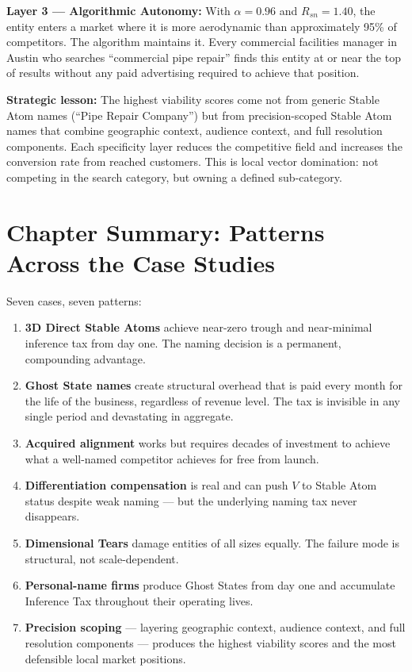 \documentclass[12pt, openany]{book}
\theoremstyle{thmstyle}
\theoremstyle{defstyle}
\begin{document}
\begin{casebox}
\textbf{Layer 3 --- Algorithmic Autonomy:} With $\alpha = 0.96$ and $R_{sn} = 1.40$, the entity enters a market where it is more aerodynamic than approximately 95\% of competitors. The algorithm maintains it. Every commercial facilities manager in Austin who searches ``commercial pipe repair'' finds this entity at or near the top of results without any paid advertising required to achieve that position.

\textbf{Strategic lesson:} The highest viability scores come not from generic Stable Atom names (``Pipe Repair Company'') but from precision-scoped Stable Atom names that combine geographic context, audience context, and full resolution components. Each specificity layer reduces the competitive field and increases the conversion rate from reached customers. This is local vector domination: not competing in the search category, but owning a defined sub-category.
\end{casebox}

\section{Chapter Summary: Patterns Across the Case Studies}

Seven cases, seven patterns:

\begin{enumerate}[leftmargin=1.5em]
  \item \textbf{3D Direct Stable Atoms} achieve near-zero trough and near-minimal inference tax from day one. The naming decision is a permanent, compounding advantage.
  \item \textbf{Ghost State names} create structural overhead that is paid every month for the life of the business, regardless of revenue level. The tax is invisible in any single period and devastating in aggregate.
  \item \textbf{Acquired alignment} works but requires decades of investment to achieve what a well-named competitor achieves for free from launch.
  \item \textbf{Differentiation compensation} is real and can push $V$ to Stable Atom status despite weak naming --- but the underlying naming tax never disappears.
  \item \textbf{Dimensional Tears} damage entities of all sizes equally. The failure mode is structural, not scale-dependent.
  \item \textbf{Personal-name firms} produce Ghost States from day one and accumulate Inference Tax throughout their operating lives.
  \item \textbf{Precision scoping} --- layering geographic context, audience context, and full resolution components --- produces the highest viability scores and the most defensible local market positions.

\end{enumerate}
\end{document}
